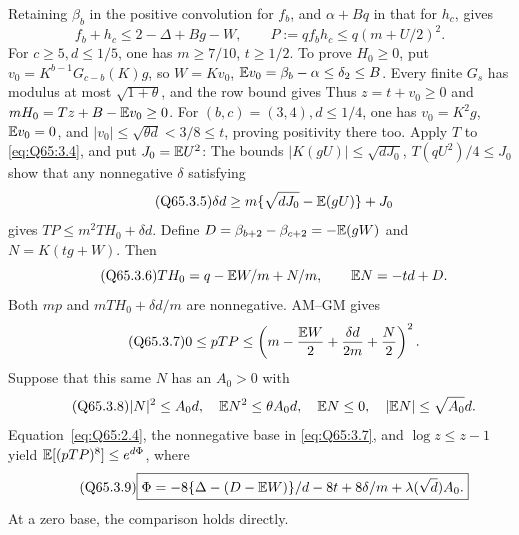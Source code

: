 Retaining \(\beta_b\) in the positive convolution for \(f_b\), and
\(\alpha+Bq\) in that for \(h_c\), gives
\begin{equation}\tag{Q65.3.4}\label{eq:Q65:3.4}
f_b+h_c\le2-\Delta+Bg-W,\qquad
P:=qf_bh_c\le q(m+U/2)^2.
\end{equation}
For \(c\ge\allowbreak 5,\allowbreak d\le\allowbreak 1/5\), one has \(m\ge\allowbreak 7/10\), \(t\ge\allowbreak 1/2\).
To prove \(H_0\ge\allowbreak 0\), put \(v_0=\allowbreak K^{b-1}G_{c-b}(K)g\), so
\(W=\allowbreak Kv_0\), \(\mathbb E v_0=\allowbreak \beta_b-\alpha\le\allowbreak \delta_2\le\allowbreak  B\).
Every finite \(G_s\) has modulus at most \(\sqrt{1+\theta}\), and
the row bound gives
Thus \(z=\allowbreak t+v_0\ge\allowbreak 0\) and \(mH_0=\allowbreak Tz+B-\mathbb E v_0\ge\allowbreak 0\).
For \((b,\allowbreak c)=\allowbreak (3,\allowbreak 4),\allowbreak d\le\allowbreak 1/4\), one has
\(v_0=\allowbreak K^2g\), \(\mathbb E v_0=\allowbreak 0\), and
\(|v_0|\le\allowbreak \sqrt{\theta d}<\allowbreak 3/8\le\allowbreak  t\), proving positivity there too.
Apply \(T\) to \eqref{eq:Q65:3.4}, and put \(J_0=\allowbreak \mathbb E U^2\):
The bounds \(|K(gU)|\le\allowbreak \sqrt{dJ_0}\), \(T(qU^2)/4\le\allowbreak  J_0\)
show that any nonnegative \(\delta\) satisfying
\begin{equation}\tag{Q65.3.5}\label{eq:Q65:3.5}
\delta d\ge m\{\sqrt{dJ_0}-\mathbb E(gU)\}+J_0
\end{equation}
gives \(TP\le\allowbreak  m^2TH_0+\delta d\).
Define \(D=\allowbreak \beta_{b+2}-\beta_{c+2}=\allowbreak -\mathbb E(gW)\) and \(N=\allowbreak K(tg+W)\).
Then
\begin{equation}\tag{Q65.3.6}\label{eq:Q65:3.6}
TH_0=q-\mathbb E W/m+N/m,\qquad\mathbb E N=-td+D.
\end{equation}
Both \(mp\) and \(mTH_0+\delta d/m\) are nonnegative. AM--GM gives
\begin{equation}\tag{Q65.3.7}\label{eq:Q65:3.7}
0\le pTP\le
\left(m-\frac{\mathbb E W}{2}+\frac{\delta d}{2m}+\frac N2\right)^2.
\end{equation}
Suppose that this same \(N\) has an \(A_0>\allowbreak 0\) with
\begin{equation}\tag{Q65.3.8}\label{eq:Q65:3.8}
|N|^2\le A_0d,\quad \mathbb E N^2\le\theta A_0d,\quad
\mathbb E N\le0,\quad|\mathbb E N|\le\sqrt{A_0}d.
\end{equation}
Equation~\eqref{eq:Q65:2.4}, the nonnegative base in
\eqref{eq:Q65:3.7}, and \(\log z\le\allowbreak  z-1\) yield
\(\mathbb E[(pTP)^8]\le\allowbreak  e^{d\Phi}\), where
\begin{equation}\tag{Q65.3.9}\label{eq:Q65:3.9}
\boxed{\Phi=-8\{\Delta-(D-\mathbb E W)\}/d-8t+8\delta/m
                   +\lambda(\sqrt d)A_0.}
\end{equation}
At a zero base, the comparison holds directly.

